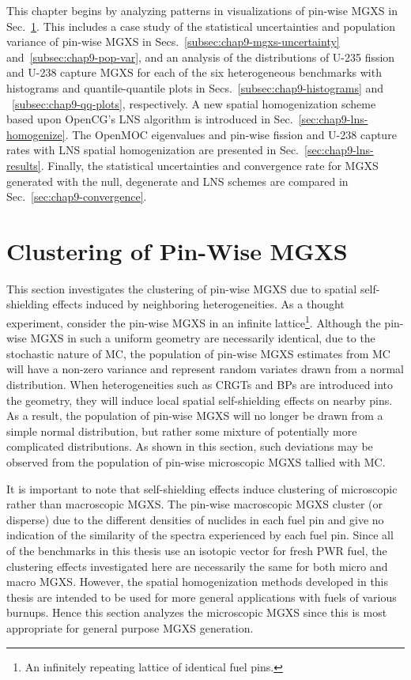 This chapter begins by analyzing patterns in visualizations of pin-wise \ac{MGXS} in Sec.~\ref{sec:chap9-clustering}. This includes a case study of the statistical uncertainties and population variance of pin-wise \ac{MGXS} in Secs.~\ref{subsec:chap9-mgxs-uncertainty} and~\ref{subsec:chap9-pop-var}, and an analysis of the distributions of U-235 fission and U-238 capture \ac{MGXS} for each of the six heterogeneous benchmarks with histograms and quantile-quantile plots in Secs.~\ref{subsec:chap9-histograms} and ~\ref{subsec:chap9-qq-plots}, respectively. A new spatial homogenization scheme based upon OpenCG's \ac{LNS} algorithm is introduced in Sec.~\ref{sec:chap9-lns-homogenize}. The OpenMOC eigenvalues and pin-wise fission and U-238 capture rates with \ac{LNS} spatial homogenization are presented in Sec.~\ref{sec:chap9-lns-results}. Finally, the statistical uncertainties and convergence rate for \ac{MGXS} generated with the null, degenerate and \ac{LNS} schemes are compared in Sec.~\ref{sec:chap9-convergence}.


\section{Clustering of Pin-Wise MGXS}
\label{sec:chap9-clustering}

This section investigates the clustering of pin-wise \ac{MGXS} due to spatial self-shielding effects induced by neighboring heterogeneities. As a thought experiment, consider the pin-wise \ac{MGXS} in an infinite lattice\footnote{An infinitely repeating lattice of identical fuel pins.}. Although the pin-wise \ac{MGXS} in such a uniform geometry are necessarily identical, due to the stochastic nature of \ac{MC}, the population of pin-wise \ac{MGXS} estimates from \ac{MC} will have a non-zero variance and represent random variates drawn from a normal distribution. When heterogeneities such as \acp{CRGT} and \acp{BP} are introduced into the geometry, they will induce local spatial self-shielding effects on nearby pins. As a result, the population of pin-wise \ac{MGXS} will no longer be drawn from a simple normal distribution, but rather some mixture of potentially more complicated distributions. As shown in this section, such deviations may be observed from the population of pin-wise microscopic \ac{MGXS} tallied with \ac{MC}.

It is important to note that self-shielding effects induce clustering of microscopic rather than macroscopic \ac{MGXS}. The pin-wise macroscopic \ac{MGXS} cluster (or disperse) due to the different densities of nuclides in each fuel pin and give no indication of the similarity of the spectra experienced by each fuel pin. Since all of the benchmarks in this thesis use an isotopic vector for fresh \ac{PWR} fuel, the clustering effects investigated here are necessarily the same for both micro and macro \ac{MGXS}. However, the spatial homogenization methods developed in this thesis are intended to be used for more general applications with fuels of various burnups. Hence this section analyzes the microscopic \ac{MGXS} since this is most appropriate for general purpose \ac{MGXS} generation.

